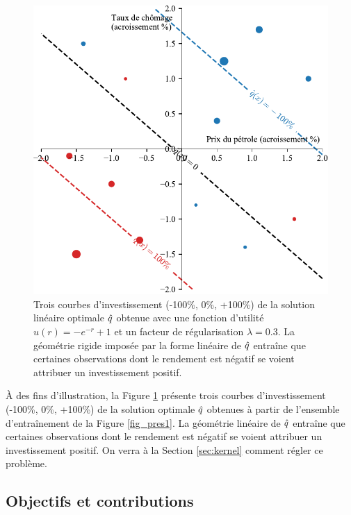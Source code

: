 \begin{figure}[p]
  \centering
  \includegraphics[width=\textwidth]{../experiments/fig/pres/pres3_fr.pdf}
  \caption[Décision linéaire]{Trois courbes d'investissement (-100\%, 0\%,
    +100\%) de la solution linéaire optimale $\hat q$ obtenue avec une fonction d'utilité
    $u(r) = -e^{-r}+1$ et un facteur de régularisation $\lambda = 0.3$. La géométrie rigide
    imposée par la forme linéaire de $\hat q$ entraîne que certaines observations dont le
    rendement est négatif se voient attribuer un investissement positif.}
  \label{fig_pres3}
\end{figure}

À des fins d'illustration, la Figure \ref{fig_pres3} présente trois courbes
d'investissement (-100\%, 0\%, +100\%) de la solution optimale $\hat q$ obtenues à partir de
l'ensemble d'entraînement de la Figure \ref{fig_pres1}. La géométrie linéaire de $\hat q$
entraîne que certaines observations dont le rendement est négatif se voient attribuer un
investissement positif. On verra à la Section \ref{sec:kernel} comment régler ce problème.



\subsection{Objectifs et contributions}

